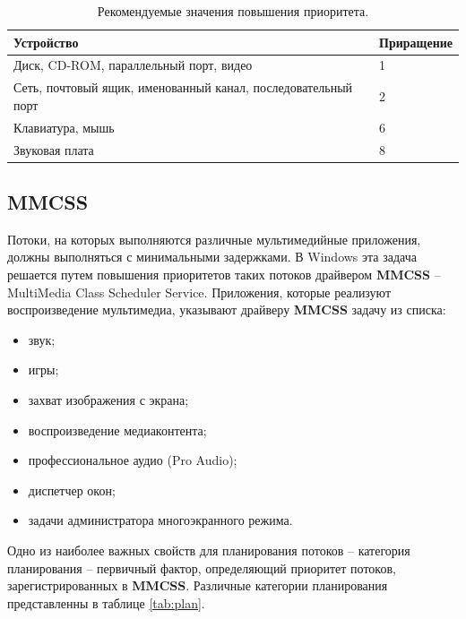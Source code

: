 \documentclass[a4paper,12pt]{extreport}
\begin{document}
\begin{table}[H]
	\caption{Рекомендуемые значения повышения приоритета.}
	\begin{center}
		\begin{tabular}{|p{100mm}|l|}
			\hline
			\textbf{Устройство} & \textbf{Приращение} \\
			\hline
			Диск, CD-ROM, параллельный порт, видео & 1 \\
			\hline
			Сеть, почтовый ящик, именованный канал, последовательный порт & 2 \\
			\hline
			Клавиатура, мышь & 6 \\
			\hline
			Звуковая плата & 8 \\
			\hline
		\end{tabular}
	\end{center}
	\label{tab:io}
\end{table}

\subsection{MMCSS}

Потоки, на которых выполняются различные мультимедийные приложения, должны выполняться с минимальными задержками. В Windows эта задача решается путем повышения приоритетов таких потоков драйвером \textbf{MMCSS} -- MultiMedia Class Scheduler Service. Приложения, которые реализуют воспроизведение мультимедиа, указывают драйверу \textbf{MMCSS} задачу из списка:

\begin{itemize}
	\item звук;
	\item игры;
	\item захват изображения с экрана;
	\item воспроизведение медиаконтента;
	\item профессиональное аудио (Pro Audio);
	\item диспетчер окон;
	\item задачи администратора многоэкранного режима.
\end{itemize}

Одно из наиболее важных свойств для планирования потоков -- категория планирования -- первичный фактор, определяющий приоритет потоков, зарегистрированных в \textbf{MMCSS}. Различные категории планирования представленны в таблице \ref{tab:plan}.
\end{document}
